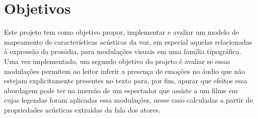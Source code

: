 \documentclass[a4paper,11pt,titlepage,singlespacing]{article}
\begin{document}




    
\section{Objetivos}
\label{sec:objetivos}

Este projeto tem como objetivo propor, implementar e avaliar um modelo de mapeamento de %
características acústicas da voz, em especial aquelas relacionadas à expressão da prosódia, para modulações visuais em uma família tipográfica. Uma vez implementado, um segundo objetivo do projeto é avaliar se essas modulações permitem ao leitor inferir a presença de emoções no áudio que não estejam explicitamente presentes no texto para, por fim, apurar que efeitos essa abordagem pode ter na imersão de um espectador que assiste a um filme em cujas legendas foram aplicadas essa modulações, nesse caso calculadas a partir de propriedades acústicas extraídas da fala dos atores.



\end{document}
